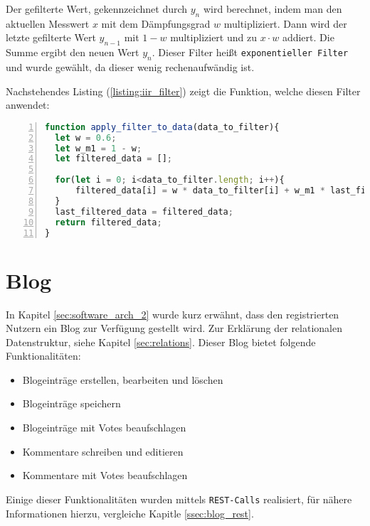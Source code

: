 \documentclass[paper=a4,12pt]{scrreprt}
\begin{document}
Der gefilterte Wert, gekennzeichnet durch $y_n$ wird berechnet, indem man den aktuellen Messwert $x$ mit dem Dämpfungsgrad $w$ multipliziert. Dann wird der letzte gefilterte Wert $y_{n-1}$ mit $1 - w$ multipliziert und zu $x \cdot w$ addiert. Die Summe ergibt den neuen Wert $y_n$.\newline
Dieser Filter heißt \texttt{exponentieller Filter}\cite{iir_filter_expo} und wurde gewählt, da dieser wenig rechenaufwändig ist.\newline

Nachstehendes Listing (\ref{listing:iir_filter}) zeigt die Funktion, welche diesen Filter anwendet:\newline

\begin{lstlisting}[caption={IIR-Filter Implementierung}, captionpos=b, label={listing:iir_filter},language=javascript, numbers=left,
  stepnumber=1]
function apply_filter_to_data(data_to_filter){
  let w = 0.6;
  let w_m1 = 1 - w;
  let filtered_data = [];

  for(let i = 0; i<data_to_filter.length; i++){
      filtered_data[i] = w * data_to_filter[i] + w_m1 * last_filtered_data[i]
  }
  last_filtered_data = filtered_data;
  return filtered_data;
}
\end{lstlisting}

\section{Blog}
\label{chap:blog}
In Kapitel \ref{sec:software_arch_2} wurde kurz erwähnt, dass den registrierten Nutzern ein Blog zur Verfügung gestellt wird. Zur Erklärung der relationalen Datenstruktur, siehe Kapitel \ref{sec:relations}.\newline
Dieser Blog bietet folgende Funktionalitäten:\newline
\begin{itemize}
  \item Blogeinträge erstellen, bearbeiten und löschen
  \item Blogeinträge speichern
  \item Blogeinträge mit Votes beaufschlagen
  \item Kommentare schreiben und editieren
  \item Kommentare mit Votes beaufschlagen
\end{itemize}

Einige dieser Funktionalitäten wurden mittels \texttt{REST-Calls} realisiert, für nähere Informationen hierzu, vergleiche Kapitle \ref{ssec:blog_rest}.\newline
\end{document}
